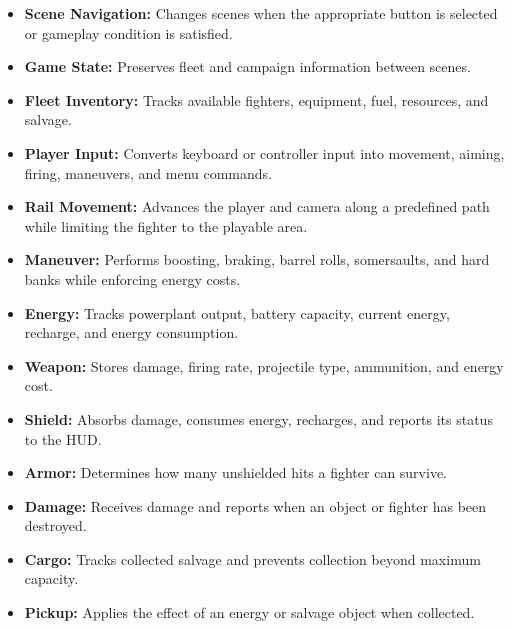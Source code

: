 \documentclass[journal]{IEEEtran}
\begin{document}
\begin{itemize}

    \item \textbf{Scene Navigation:}
    Changes scenes when the appropriate button is selected or gameplay condition is satisfied.

    \item \textbf{Game State:}
    Preserves fleet and campaign information between scenes.

    \item \textbf{Fleet Inventory:}
    Tracks available fighters, equipment, fuel, resources, and salvage.

    \item \textbf{Player Input:}
    Converts keyboard or controller input into movement, aiming, firing, maneuvers, and menu commands.

    \item \textbf{Rail Movement:}
    Advances the player and camera along a predefined path while limiting the fighter to the playable area.

    \item \textbf{Maneuver:}
    Performs boosting, braking, barrel rolls, somersaults, and hard banks while enforcing energy costs.

    \item \textbf{Energy:}
    Tracks powerplant output, battery capacity, current energy, recharge, and energy consumption.

    \item \textbf{Weapon:}
    Stores damage, firing rate, projectile type, ammunition, and energy cost.

    \item \textbf{Shield:}
    Absorbs damage, consumes energy, recharges, and reports its status to the HUD.

    \item \textbf{Armor:}
    Determines how many unshielded hits a fighter can survive.

    \item \textbf{Damage:}
    Receives damage and reports when an object or fighter has been destroyed.

    \item \textbf{Cargo:}
    Tracks collected salvage and prevents collection beyond maximum capacity.

    \item \textbf{Pickup:}
    Applies the effect of an energy or salvage object when collected.


\end{itemize}
\end{document}
